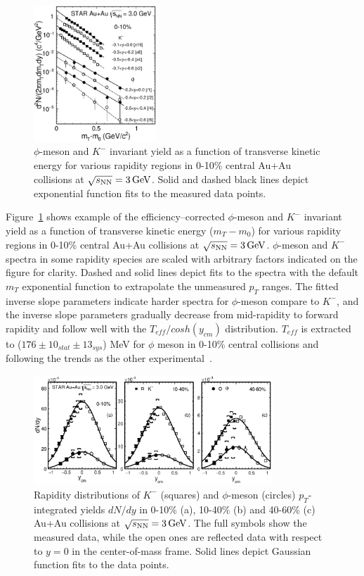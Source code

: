\documentclass[%
 reprint,	
showpacs,
 amsmath,amssymb,
 aps,
 prc,
]{revtex4-1}
\begin{document}
\begin{figure}
\centering
\includegraphics[width=0.41\textwidth]{fig/fig2_h_mT_spectra_phiMeson.eps}
  \caption{ $\phi$-meson and $K^-$ invariant yield as a function of transverse kinetic energy for various rapidity regions in 0-10\% central Au+Au collisions at ${\sqrt{s_{\rm NN}} = \rm{3\,GeV}}$. Solid and dashed black lines depict exponential function fits to the measured data points.}
\label{fig:phimTSpectra} 
\end{figure}

Figure~\ref{fig:phimTSpectra} shows example of the efficiency--corrected $\phi$-meson and $K^-$ invariant yield as a function of transverse kinetic energy ($m_T-m_0$) for various rapidity regions in 0-10\% central Au+Au collisions at ${\sqrt{s_{\rm NN}} = \rm{3\,GeV}}$. $\phi$-meson and $K^-$ spectra in some rapidity species are scaled with arbitrary factors indicated on the figure for clarity. Dashed and solid lines depict fits to the spectra with the default $m_T$ exponential function to extrapolate the unmeasured $p_T$ ranges. The fitted inverse slope parameters indicate harder spectra for $\phi$-meson compare to $K^-$, and the inverse slope parameters gradually decrease from mid-rapidity to forward rapidity and follow well with the $T_{eff}/cosh(y_{cm})$ distribution. $T_{eff}$ is extracted to ($176\pm10_{stat}\pm13_{sys}$) MeV for $\phi$ meson in 0-10\% central collisions and following the trends as the other experimental~\cite{2018403,PhysRevC.80.025209,PhysRevC.78.044907}.


\begin{figure}
\centering
\includegraphics[width=0.8\textwidth]{fig/fig3_dndy.eps}
  \caption{ Rapidity distributions of $K^-$ (squares) and $\phi$-meson (circles) $p_T$-integrated yields $dN/dy$ in 0-10\% (a), 10-40\% (b) and 40-60\% (c) Au+Au collisions at ${\sqrt{s_{\rm NN}} = \rm{3\,GeV}}$. The full symbols show the measured data, while the open ones are reflected data with respect to $y=0$ in the center-of-mass frame. Solid lines depict Gaussian function fits to the data points.}
\label{fig:phiYSpectra} 
\end{figure}
\end{document}
